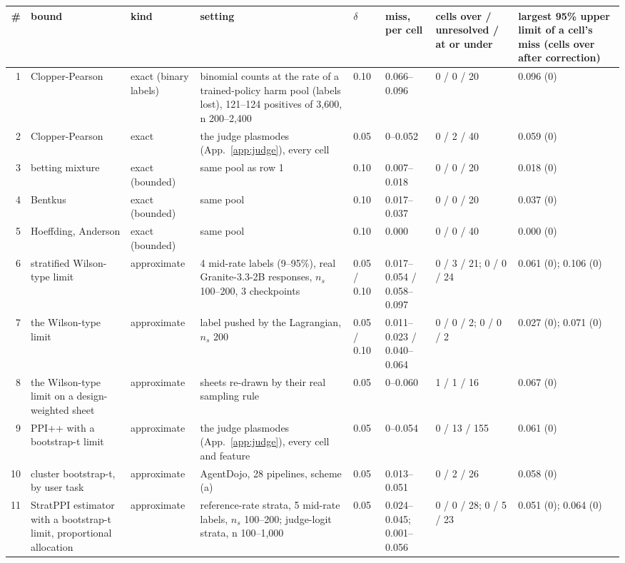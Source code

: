 \begin{tabular}{@{}r p{2.8cm} p{2.0cm} p{3.9cm} l p{2.1cm} p{2.0cm} p{1.9cm}@{}}
\toprule
\textbf{\#} & \textbf{bound} & \textbf{kind} & \textbf{setting} & \textbf{$\delta$} & \textbf{miss, per cell} & \textbf{cells over / unresolved / at or under} & \textbf{largest 95\% upper limit of a cell's miss (cells over after correction)} \\
\midrule
1 & Clopper-Pearson & exact (binary labels) & binomial counts at the rate of a trained-policy harm pool (labels lost), 121--124 positives of 3,600, n 200--2,400 & 0.10 & 0.066--0.096 & 0 / 0 / 20 & 0.096 (0) \\
2 & Clopper-Pearson & exact & the judge plasmodes (App.~\ref{app:judge}), every cell & 0.05 & 0--0.052 & 0 / 2 / 40 & 0.059 (0) \\
3 & betting mixture & exact (bounded) & same pool as row 1 & 0.10 & 0.007--0.018 & 0 / 0 / 20 & 0.018 (0) \\
4 & Bentkus & exact (bounded) & same pool & 0.10 & 0.017--0.037 & 0 / 0 / 20 & 0.037 (0) \\
5 & Hoeffding, Anderson & exact (bounded) & same pool & 0.10 & 0.000 & 0 / 0 / 40 & 0.000 (0) \\
6 & stratified Wilson-type limit & approximate & 4 mid-rate labels (9--95\%), real Granite-3.3-2B responses, $n_s$ 100--200, 3 checkpoints & 0.05 / 0.10 & 0.017--0.054 / 0.058--0.097 & 0 / 3 / 21; 0 / 0 / 24 & 0.061 (0); 0.106 (0) \\
7 & the Wilson-type limit & approximate & label pushed by the Lagrangian, $n_s$ 200 & 0.05 / 0.10 & 0.011--0.023 / 0.040--0.064 & 0 / 0 / 2; 0 / 0 / 2 & 0.027 (0); 0.071 (0) \\
8 & the Wilson-type limit on a design-weighted sheet & approximate & sheets re-drawn by their real sampling rule & 0.05 & 0--0.060 & 1 / 1 / 16 & 0.067 (0) \\
9 & PPI++ with a bootstrap-t limit & approximate & the judge plasmodes (App.~\ref{app:judge}), every cell and feature & 0.05 & 0--0.054 & 0 / 13 / 155 & 0.061 (0) \\
10 & cluster bootstrap-t, by user task & approximate & AgentDojo, 28 pipelines, scheme (a) & 0.05 & 0.013--0.051 & 0 / 2 / 26 & 0.058 (0) \\
11 & StratPPI estimator with a bootstrap-t limit, proportional allocation & approximate & reference-rate strata, 5 mid-rate labels, $n_s$ 100--200; judge-logit strata, n 100--1,000 & 0.05 & 0.024--0.045; 0.001--0.056 & 0 / 0 / 28; 0 / 5 / 23 & 0.051 (0); 0.064 (0) \\

\end{tabular}
